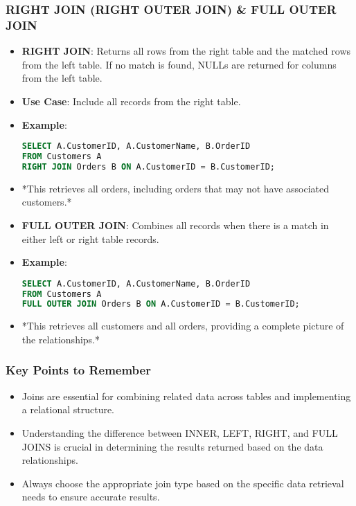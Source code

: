 \documentclass[aspectratio=169]{beamer}
\begin{document}
\begin{frame}[fragile]
    \frametitle{RIGHT JOIN (RIGHT OUTER JOIN) \& FULL OUTER JOIN}
    \begin{itemize}
        \item \textbf{RIGHT JOIN}: Returns all rows from the right table and the matched rows from the left table. If no match is found, NULLs are returned for columns from the left table.
        \item \textbf{Use Case}: Include all records from the right table.
        \item \textbf{Example}:
        \begin{lstlisting}[language=SQL]
SELECT A.CustomerID, A.CustomerName, B.OrderID
FROM Customers A
RIGHT JOIN Orders B ON A.CustomerID = B.CustomerID;
        \end{lstlisting}
        \item *This retrieves all orders, including orders that may not have associated customers.*
    \end{itemize}
    
    \begin{itemize}
        \item \textbf{FULL OUTER JOIN}: Combines all records when there is a match in either left or right table records.
        \item \textbf{Example}:
        \begin{lstlisting}[language=SQL]
SELECT A.CustomerID, A.CustomerName, B.OrderID
FROM Customers A
FULL OUTER JOIN Orders B ON A.CustomerID = B.CustomerID;
        \end{lstlisting}
        \item *This retrieves all customers and all orders, providing a complete picture of the relationships.*
    \end{itemize}
\end{frame}

\begin{frame}
    \frametitle{Key Points to Remember}
    \begin{itemize}
        \item Joins are essential for combining related data across tables and implementing a relational structure.
        \item Understanding the difference between INNER, LEFT, RIGHT, and FULL JOINS is crucial in determining the results returned based on the data relationships.
        \item Always choose the appropriate join type based on the specific data retrieval needs to ensure accurate results.
    \end{itemize}
\end{frame}
\end{document}
